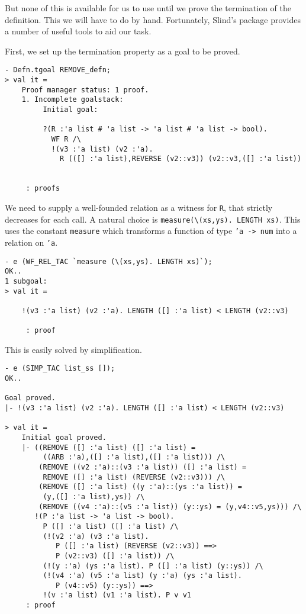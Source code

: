 But none of this is available for us to use until we prove the
termination of the definition. This we will have to do by hand.
Fortunately, Slind's package provides a number of useful tools
to aid our task.

First, we set up the termination property as a goal to be proved.
\begin{session}
\begin{verbatim}
- Defn.tgoal REMOVE_defn;
> val it =
    Proof manager status: 1 proof.
    1. Incomplete goalstack:
         Initial goal:
    
         ?(R :'a list # 'a list -> 'a list # 'a list -> bool).
           WF R /\
           !(v3 :'a list) (v2 :'a).
             R (([] :'a list),REVERSE (v2::v3)) (v2::v3,([] :'a list))
    
    
     : proofs
\end{verbatim}
\end{session}
We need to supply a well-founded relation as a witness for {\tt R},
that strictly decreases for each call. A natural choice is
{\tt measure(\verb|\|(xs,ys).~LENGTH~xs)}. This uses the
constant {\tt measure} which transforms a function of type
{\tt 'a~->~num} into a relation on {\tt 'a}.
\begin{session}
\begin{verbatim}
- e (WF_REL_TAC `measure (\(xs,ys). LENGTH xs)`);
OK..
1 subgoal:
> val it =
    
    !(v3 :'a list) (v2 :'a). LENGTH ([] :'a list) < LENGTH (v2::v3)
    
     : proof
\end{verbatim}
\end{session}
This is easily solved by simplification.
\begin{session}
\begin{verbatim}
- e (SIMP_TAC list_ss []);
OK..

Goal proved.
|- !(v3 :'a list) (v2 :'a). LENGTH ([] :'a list) < LENGTH (v2::v3)

> val it =
    Initial goal proved.
    |- ((REMOVE ([] :'a list) ([] :'a list) =
         ((ARB :'a),([] :'a list),([] :'a list))) /\
        (REMOVE ((v2 :'a)::(v3 :'a list)) ([] :'a list) =
         REMOVE ([] :'a list) (REVERSE (v2::v3))) /\
        (REMOVE ([] :'a list) ((y :'a)::(ys :'a list)) =
         (y,([] :'a list),ys)) /\
        (REMOVE ((v4 :'a)::(v5 :'a list)) (y::ys) = (y,v4::v5,ys))) /\
       !(P :'a list -> 'a list -> bool).
         P ([] :'a list) ([] :'a list) /\
         (!(v2 :'a) (v3 :'a list).
            P ([] :'a list) (REVERSE (v2::v3)) ==>
            P (v2::v3) ([] :'a list)) /\
         (!(y :'a) (ys :'a list). P ([] :'a list) (y::ys)) /\
         (!(v4 :'a) (v5 :'a list) (y :'a) (ys :'a list).
            P (v4::v5) (y::ys)) ==>
         !(v :'a list) (v1 :'a list). P v v1
     : proof
\end{verbatim}
\end{session}

